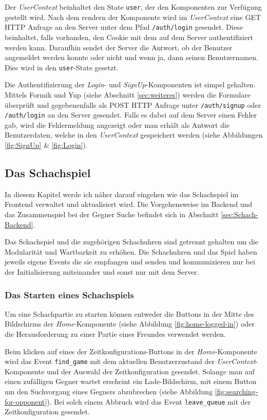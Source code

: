 Der \textit{UserContext} beinhaltet den State \verb|user|, der den Komponenten zur Verfügung gestellt wird.
Nach dem rendern der Komponente wird im \textit{UserContext} eine GET HTTP Anfrage an den Server unter dem Pfad \verb|/auth/login| gesendet. Diese beinhaltet, falls vorhanden, den Cookie mit dem auf dem Server authentifiziert werden kann. Daraufhin sendet der Server die Antwort, ob der Benutzer angemeldet werden konnte oder nicht und wenn ja, dann seinen Benutzernamen.
Dies wird in den \verb|user|-State gesetzt.

Die Authentifizierung der \textit{Login}- und \textit{SignUp}-Komponenten ist simpel gehalten. Mittels Formik und Yup (siehe Abschnitt \ref{sec:weiteres}) werden die Formulare überprüft und gegebenenfalls als POST HTTP Anfrage unter \verb|/auth/signup| oder \verb|/auth/login| an den Server gesendet. Falls es dabei auf dem Server einen Fehler gab, wird die Fehlermeldung angezeigt oder man erhält als Antwort die Benutzerdaten, welche in den \textit{UserContext} gespeichert werden (siehe Abbildungen \ref{fig:SignUp} \& \ref{fig:Login}).
        
        \subsection{Das Schachspiel}
        \label{sec:Schachspiel}
        In diesem Kapitel werde ich näher darauf eingehen wie das Schachspiel im Frontend verwaltet und aktualisiert wird. Die Vorgehensweise im Backend und das Zusammenspiel bei der Gegner Suche befindet sich in Abschnitt \ref{sec:Schach-Backend}.
        
Das Schachspiel und die zugehörigen Schachuhren sind getrennt gehalten um die Modularität und Wartbarkeit zu erhöhen. Die Schachuhren und das Spiel haben jeweils eigene Events die sie empfangen und senden und kommunizieren nur bei der Initialisierung miteinander und sonst nur mit dem Server.
		\subsubsection{Das Starten eines Schachspiels}
		\label{sec:Frontend-Schach-Start}
Um eine Schachpartie zu starten können entweder die Buttons in der Mitte des Bildschirms der \textit{Home}-Komponente (siehe Abbildung \ref{fig:home-logged-in}) oder die Herausforderung zu einer Partie eines Freundes verwendet werden.

Beim klicken auf eines der Zeitkonfigurations-Buttons in der \textit{Home}-Komponente wird das Event \verb|find_game| mit dem aktuellen Benutzerzustand der \textit{UserContext}-Komponente und der Auswahl der Zeitkonfiguration gesendet. Solange man auf einen zufälligen Gegner wartet erscheint ein Lade-Bildschirm, mit einem Button um den Suchvorgang eines Gegners abzubrechen (siehe Abbildung \ref{fig:searching-for-opponent}). Bei solch einem Abbruch wird das Event \verb|leave_queue| mit der Zeitkonfiguration gesendet.

